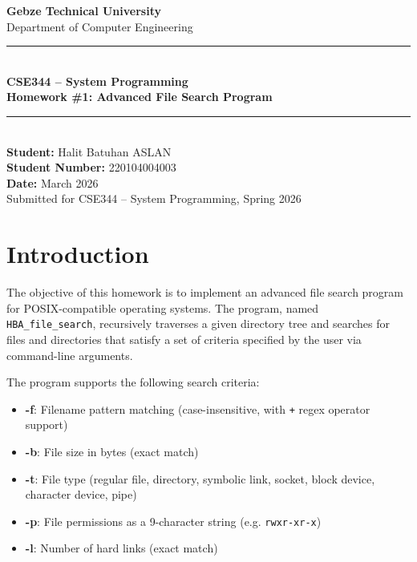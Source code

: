 \documentclass[12pt, a4paper]{article}
\begin{document}
\begin{titlepage}
    \centering
    \vspace*{2cm}

    {\LARGE \textbf{Gebze Technical University}} \\[0.5cm]
    {\large Department of Computer Engineering} \\[2cm]

    \rule{\linewidth}{0.5mm} \\[0.4cm]
    {\huge \textbf{CSE344 -- System Programming}} \\[0.3cm]
    {\Large \textbf{Homework \#1: Advanced File Search Program}} \\[0.1cm]
    \rule{\linewidth}{0.5mm} \\[2cm]

    {\large \textbf{Student:} Halit Batuhan ASLAN} \\[0.3cm]
    {\large \textbf{Student Number:} 220104004003} \\[0.3cm]
    {\large \textbf{Date:} March 2026} \\[3cm]

    \vfill
    {\small Submitted for CSE344 -- System Programming, Spring 2026}
\end{titlepage}

\tableofcontents
\newpage

\section{Introduction}

The objective of this homework is to implement an advanced file search program for
POSIX-compatible operating systems. The program, named \texttt{HBA_file_search}, recursively
traverses a given directory tree and searches for files and directories that satisfy
a set of criteria specified by the user via command-line arguments.

The program supports the following search criteria:

\begin{itemize}[noitemsep]
    \item \textbf{-f}: Filename pattern matching (case-insensitive, with \texttt{+} regex operator support)
    \item \textbf{-b}: File size in bytes (exact match)
    \item \textbf{-t}: File type (regular file, directory, symbolic link, socket, block device, character device, pipe)
    \item \textbf{-p}: File permissions as a 9-character string (e.g. \texttt{rwxr-xr-x})
    \item \textbf{-l}: Number of hard links (exact match)
\end{itemize}
\end{document}

